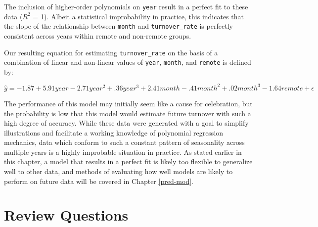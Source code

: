 \documentclass[
]{book}
\begin{document}
The inclusion of higher-order polynomials on \texttt{year} result in a perfect fit to these data (\(R^2\) = 1). Albeit a statistical improbability in practice, this indicates that the slope of the relationship between \texttt{month} and \texttt{turnover\_rate} is perfectly consistent across years within remote and non-remote groups.

Our resulting equation for estimating \texttt{turnover\_rate} on the basis of a combination of linear and non-linear values of \texttt{year}, \texttt{month}, and \texttt{remote} is defined by:

\[ \hat y = -1.87 + 5.91year - 2.71year^2 + .36year^3 + 2.41month - .41month^2 + .02month^3 - 1.64remote + \epsilon \]

The performance of this model may initially seem like a cause for celebration, but the probability is low that this model would estimate future turnover with such a high degree of accuracy. While these data were generated with a goal to simplify illustrations and facilitate a working knowledge of polynomial regression mechanics, data which conform to such a constant pattern of seasonality across multiple years is a highly improbable situation in practice. As stated earlier in this chapter, a model that results in a perfect fit is likely too flexible to generalize well to other data, and methods of evaluating how well models are likely to perform on future data will be covered in Chapter \ref{pred-mod}.

\hypertarget{review-questions-9}{%
\section{Review Questions}\label{review-questions-9}}
\end{document}
